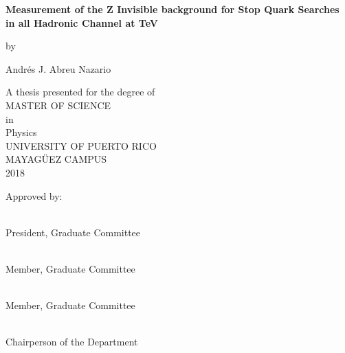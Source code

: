\begin{titlepage}
    \begin{center}
    
       \BgThispage
        \vspace*{1cm}
      \Large  
        \textbf{Measurement of the Z Invisible background for Stop Quark Searches in all Hadronic Channel at  TeV}
        
        \normalsize
        \vspace{0.5cm}
        by
        
        \vspace{0.25cm}
        
        Andr\'es J. Abreu Nazario
        
        \vspace{0.5cm}	
        
        A thesis presented for the degree of\\
        \vspace{0.5cm}
        MASTER OF SCIENCE\\
        \vspace{0.5cm}
        in\\
        \vspace{0.5cm}
        Physics\\
        \vspace{0.5cm}
        UNIVERSITY OF PUERTO RICO\\
        MAYAG\"UEZ CAMPUS\\
        2018
        \vspace{0.8cm}
        
        \end{center}
        
        Approved by:
        
        \vspace{1.0cm}

\\President, Graduate Committee

\vspace{1.0cm}

\\Member, Graduate Committee

\vspace{1.0cm}

\\Member, Graduate Committee

\vspace{1.0cm}

\\Chairperson of the Department



\end{titlepage}